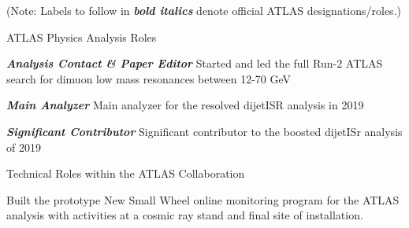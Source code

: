 \hspace{0.45in}
\begin{minipage}{0.8\textwidth}

(Note: Labels to follow in \textbf{\textit{bold italics}} denote official ATLAS designations/roles.)
\vspace{0.15in}

ATLAS Physics Analysis Roles
\vspace{0.1in}

\hspace{0.2in}
\begin{minipage}{\textwidth}
\textbf{\textit{Analysis Contact \& Paper Editor}} Started and led the full Run-2 ATLAS search for dimuon low mass resonances between 12-70 GeV
\end{minipage}

\vspace{0.1in}
\hspace{0.2in}
\begin{minipage}{\textwidth}
\textbf{\textit{Main Analyzer}} Main analyzer for the resolved dijetISR analysis in 2019%
\end{minipage}


\vspace{0.1in}
\hspace{0.2in}
\begin{minipage}{\textwidth}
\textbf{\textit{Significant Contributor}} Significant contributor to the boosted dijetISr analysis of 2019%
\end{minipage}

\vspace{0.15in}
Technical Roles within the ATLAS Collaboration

\vspace{0.15in}
\hspace{0.2in}
\begin{minipage}{\textwidth}
    Built the prototype New Small Wheel online monitoring program for the ATLAS analysis with activities at a cosmic ray stand and final site of installation.
\end{minipage}

\end{minipage}




